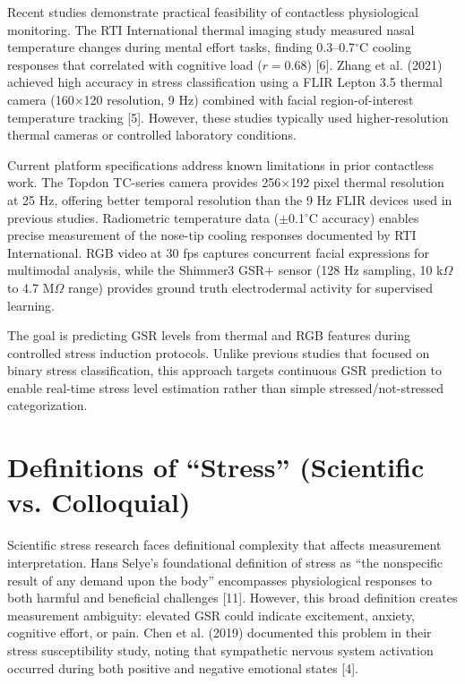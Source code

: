Recent studies demonstrate practical feasibility of contactless physiological monitoring. The RTI International thermal imaging study measured nasal temperature changes during mental effort tasks, finding 0.3--0.7$^\circ$C cooling responses that correlated with cognitive load ($r = 0.68$) [6]. Zhang et al. (2021) achieved high accuracy in stress classification using a FLIR Lepton 3.5 thermal camera (160$\times$120 resolution, 9 Hz) combined with facial region-of-interest temperature tracking [5]. However, these studies typically used higher-resolution thermal cameras or controlled laboratory conditions.

Current platform specifications address known limitations in prior contactless work. The Topdon TC-series camera provides 256$\times$192 pixel thermal resolution at 25 Hz, offering better temporal resolution than the 9 Hz FLIR devices used in previous studies. Radiometric temperature data ($\pm$0.1$^\circ$C accuracy) enables precise measurement of the nose-tip cooling responses documented by RTI International. RGB video at 30 fps captures concurrent facial expressions for multimodal analysis, while the Shimmer3 GSR+ sensor (128 Hz sampling, 10 k$\Omega$ to 4.7 M$\Omega$ range) provides ground truth electrodermal activity for supervised learning.

The goal is predicting GSR levels from thermal and RGB features during controlled stress induction protocols. Unlike previous studies that focused on binary stress classification, this approach targets continuous GSR prediction to enable real-time stress level estimation rather than simple stressed/not-stressed categorization.

\section{Definitions of ``Stress'' (Scientific vs. Colloquial)}
Scientific stress research faces definitional complexity that affects measurement interpretation. Hans Selye's foundational definition of stress as ``the nonspecific result of any demand upon the body'' encompasses physiological responses to both harmful and beneficial challenges [11]. However, this broad definition creates measurement ambiguity: elevated GSR could indicate excitement, anxiety, cognitive effort, or pain. Chen et al. (2019) documented this problem in their stress susceptibility study, noting that sympathetic nervous system activation occurred during both positive and negative emotional states [4].

